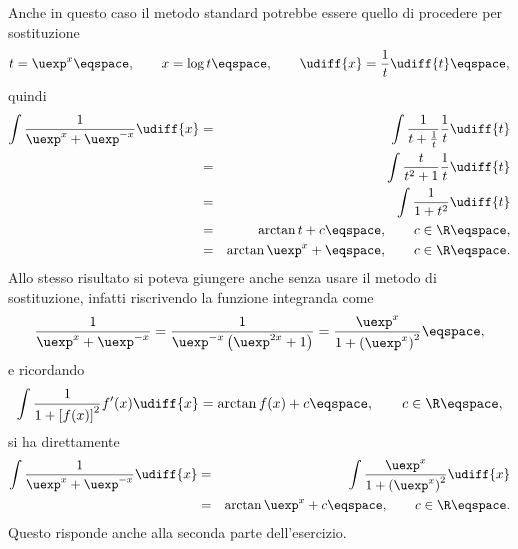 \begin{Solution}
Anche in questo caso il metodo standard potrebbe essere quello di procedere per
sostituzione
\begin{displaymath}
 t = \uexp^{x} \eqspace, \qquad x = \log t \eqspace, \qquad \udiff{x} =
\frac{1}{t} \udiff{t} \eqspace ,
\end{displaymath}
quindi 
\begin{eqnarray*}
\int \frac{1}{\uexp^{x} + \uexp^{-x}}\udiff{x} &=& \int \frac{1}{t + \frac{1}{t}}
\frac{1}{t} \udiff{t} \\
&=& \int \frac{t}{t^{2} + 1 } \frac{1}{t} \udiff{t} \\
&=& \int \frac{1}{1+t^{2}} \udiff{t} \\
&=& \arctan t + c \eqspace , \qquad c\in\R \eqspace, \\
&=& \arctan \uexp^{x} + \eqspace, \qquad c \in \R \eqspace .
\end{eqnarray*}
Allo stesso risultato si poteva giungere anche senza usare il metodo di
sostituzione, infatti riscrivendo la funzione integranda come
\begin{displaymath}
\frac{1}{\uexp^{x} + \uexp^{-x}} = \frac{1}{\uexp^{-x} \left( \uexp^{2x} + 1
\right)} = \frac{\uexp^{x}}{1+ \left( \uexp^{x} \right)^{2}} \eqspace, 
\end{displaymath}
e ricordando
\begin{displaymath}
\int \frac{1}{1+\left[ f(x)\right]^{2}} f^{\prime}(x) \udiff{x} = \arctan f(x) +
c\eqspace, \qquad c \in\R \eqspace, 
\end{displaymath}
si ha direttamente 
\begin{eqnarray*}
\int \frac{1}{\uexp^{x} + \uexp^{-x}} \udiff{x}  &=& 
\int\frac{\uexp^{x}}{1+ \left( \uexp^{x} \right)^{2}} \udiff{x} \\
&=& \arctan \uexp^{x} + c\eqspace , \qquad c\in\R \eqspace .
\end{eqnarray*}
Questo risponde anche alla seconda parte dell'esercizio.
\end{Solution}
